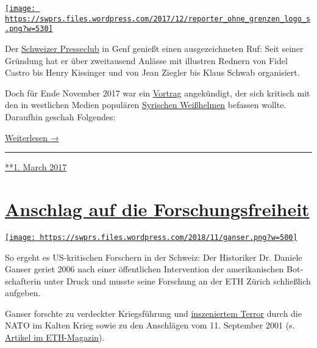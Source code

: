 \href{https://swprs.org/2017/03/01/die-grenzen-der-pressefreiheit/}{\texttt{[image: https://swprs.files.wordpress.com/2017/12/reporter\_ohne\_grenzen\_logo\_s.png?w=530]}}

Der \href{http://pressclub.ch/?lang=en}{Schweizer Presseclub} in Genf
genießt einen ausgezeichneten Ruf: Seit seiner Gründung hat er über
zweitausend Anlässe mit illustren Rednern von Fidel Castro bis Henry
Kissinger und von Jean Ziegler bis Klaus Schwab organisiert.

Doch für Ende November 2017 war ein
\href{http://pressclub.ch/they-dont-care-about-us-white-helmets-true-agenda/?lang=en}{Vortrag}
angekündigt, der sich kritisch mit den in west­li­chen Medien populären
\href{https://www.hintergrund.de/globales/kriege/weisse-helme-ohne-weisse-westen/}{Syrischen
Weiß­helmen} befassen wollte. Daraufhin geschah Folgendes:

\href{https://swprs.org/die-grenzen-der-pressefreiheit/}{Weiterlesen →}

\begin{center}\rule{0.5\linewidth}{\linethickness}\end{center}

\href{https://swprs.org/2017/03/01/die-grenzen-der-pressefreiheit/}{**1.
March 2017}

\hypertarget{anschlag-auf-die-forschungsfreiheit}{%
\section{\texorpdfstring{\href{https://swprs.org/2017/03/01/anschlag-auf-die-forschungsfreiheit/}{Anschlag
auf die
Forschungsfreiheit}}{Anschlag auf die Forschungsfreiheit}}\label{anschlag-auf-die-forschungsfreiheit}}

\href{https://swprs.org/2017/03/01/anschlag-auf-die-forschungsfreiheit/}{\texttt{[image: https://swprs.files.wordpress.com/2018/11/ganser.png?w=500]}}

So ergeht es US-kritischen Forschern in der Schweiz: Der Historiker Dr.
Daniele Ganser geriet 2006 nach einer öffentlichen Inter­vention der
amerika­nischen Bot­schaf­terin unter Druck und musste seine Forschung
an der ETH Zürich schließlich aufgeben.

Ganser forschte zu ver­deckter Kriegs­führung und
\href{http://ofv.ch/sachbuch/detail/natogeheimarmeen-in-europa/3193/}{ins­ze­nier­tem
Terror} durch die NATO im Kalten Krieg sowie zu den An­schlägen vom 11.
September 2001 (s.
\href{http://archiv.ethlife.ethz.ch/articles/9.11.html}{Artikel im
ETH-Magazin}).

